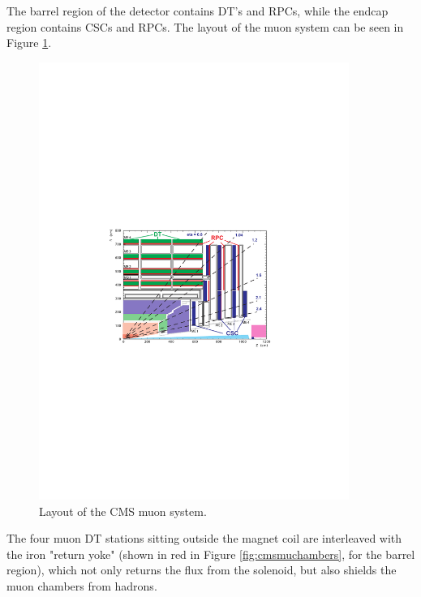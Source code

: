  The barrel region of the detector contains DT's and RPCs, while the endcap region contains CSCs and RPCs. The layout of the muon system can be seen in Figure \ref{fig:cmsmuonsys}. 

    \begin{figure}[h]
 	\centering
 	\includegraphics[width=0.9\textwidth]{figures/CMS_muon_system.pdf}
 	\singlespace
 	\caption{Layout of the CMS muon system.}
 	\label{fig:cmsmuonsys}
	\end{figure}

The four muon DT stations sitting outside the magnet coil are interleaved with the
iron "return yoke" (shown in red in Figure \ref{fig:cmsmuchambers}, for the barrel region), which not only returns the flux from the solenoid, but also shields the muon chambers from hadrons. 

